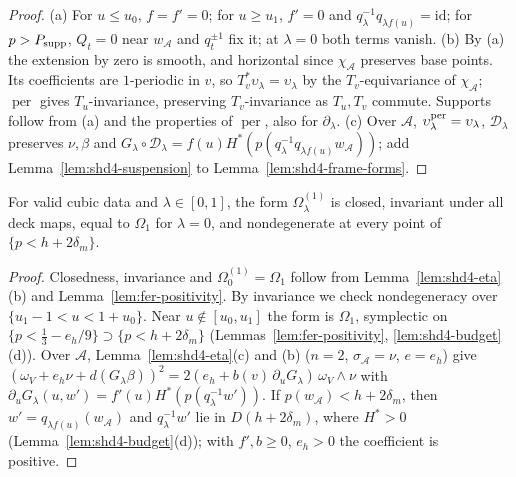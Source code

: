 \begin{proof}
(a) For $u\le u_0$, $f=f'=0$; for $u\ge u_1$, $f'=0$ and $q_\lambda^{-1}q_{\lambda f(u)}=\mathrm{id}$; for $p>P_{\rm supp}$, $Q_t=0$ near $w_{\mathcal A}$ and $q_t^{\pm1}$ fix it; at $\lambda=0$ both terms vanish.
(b) By (a) the extension by zero is smooth, and horizontal since $\chi_{\mathcal A}$ preserves base points. Its coefficients are $1$-periodic in $v$, so $T_v^*\upsilon_\lambda=\upsilon_\lambda$ by the $T_v$-equivariance of $\chi_{\mathcal A}$; $\operatorname{per}$ gives $T_u$-invariance, preserving $T_v$-invariance as $T_u,T_v$ commute. Supports follow from (a) and the properties of $\operatorname{per}$, also for $\partial_\lambda$.
(c) Over $\mathcal A$, $\upsilon^{\rm per}_\lambda=\upsilon_\lambda$, $\mathcal D_\lambda$ preserves $\nu,\beta$ and $G_\lambda\circ\mathcal D_\lambda=f(u)H^*(p(q_\lambda^{-1}q_{\lambda f(u)}w_{\mathcal A}))$; add Lemma~\ref{lem:shd4-suspension} to Lemma~\ref{lem:shd4-frame-forms}.
\end{proof}

\begin{proposition}\label{prop:shd4-second}
For valid cubic data and $\lambda\in[0,1]$, the form $\Omega^{(1)}_\lambda$ is closed, invariant under all deck maps, equal to
$\Omega_1$ for $\lambda=0$, and nondegenerate at every point of $\{p<h+2\delta_m\}$.
\end{proposition}

\begin{proof}
Closedness, invariance and $\Omega^{(1)}_0=\Omega_1$ follow from Lemma~\ref{lem:shd4-eta}(b) and Lemma~\ref{lem:fer-positivity}. By invariance we check nondegeneracy over $\{u_1-1<u<1+u_0\}$. Near $u\notin[u_0,u_1]$ the form is $\Omega_1$, symplectic on $\{p<\frac13-e_h/9\}\supset\{p<h+2\delta_m\}$ (Lemmas~\ref{lem:fer-positivity}, \ref{lem:shd4-budget}(d)). Over $\mathcal A$, Lemma~\ref{lem:shd4-eta}(c) and (b) ($n=2$, $\sigma_{\mathcal A}=\nu$, $e=e_h$) give $(\omega_V+e_h\nu+d(G_\lambda\beta))^2=2(e_h+b(v)\,\partial_uG_\lambda)\,\omega_V\wedge\nu$ with $\partial_uG_\lambda(u,w')=f'(u)H^*(p(q_\lambda^{-1}w'))$. If $p(w_{\mathcal A})<h+2\delta_m$, then $w'=q_{\lambda f(u)}(w_{\mathcal A})$ and $q_\lambda^{-1}w'$ lie in $D(h+2\delta_m)$, where $H^*>0$ (Lemma~\ref{lem:shd4-budget}(d)); with $f',b\ge0$, $e_h>0$ the coefficient is positive.
\end{proof}

